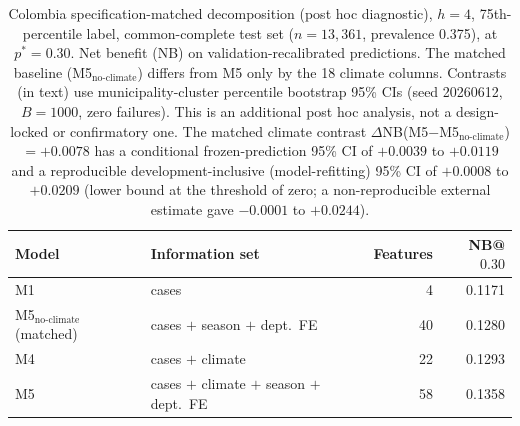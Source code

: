 \documentclass[11pt,a4paper]{article}
\begin{document}
\begin{table}[H]
\centering
\caption{Colombia specification-matched decomposition (post hoc diagnostic), $h=4$, 75th-percentile label, common-complete test set ($n=13{,}361$, prevalence 0.375), at $p^*=0.30$. Net benefit (NB) on validation-recalibrated predictions. The matched baseline (M5$_{\text{no-climate}}$) differs from M5 only by the 18 climate columns. Contrasts (in text) use municipality-cluster percentile bootstrap 95\% CIs (seed 20260612, $B=1000$, zero failures). This is an additional post hoc analysis, not a design-locked or confirmatory one. The matched climate contrast $\Delta$NB(M5$-$M5$_{\text{no-climate}}$)$=+0.0078$ has a conditional frozen-prediction 95\% CI of $+0.0039$ to $+0.0119$ and a reproducible development-inclusive (model-refitting) 95\% CI of $+0.0008$ to $+0.0209$ (lower bound at the threshold of zero; a non-reproducible external estimate gave $-0.0001$ to $+0.0244$).}
\label{tab:matcheddecomp}
\begin{tabular}{llrr}
\toprule
Model & Information set & Features & NB@$0.30$ \\
\midrule
M1 & cases & 4 & 0.1171 \\
M5$_{\text{no-climate}}$ (matched) & cases $+$ season $+$ dept.\ FE & 40 & 0.1280 \\
M4 & cases $+$ climate & 22 & 0.1293 \\
M5 & cases $+$ climate $+$ season $+$ dept.\ FE & 58 & 0.1358 \\
\bottomrule
\end{tabular}
\end{table}
\end{document}
